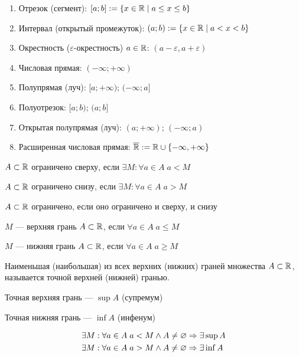 \documentclass{article}
\begin{document}

\begin{enumerate}
	\item Отрезок (сегмент): $[a;b] := \{x\in\mathbb{R}\;|\;a\leq x\leq b\}$
	\item Интервал (открытый промежуток): $(a;b) := \{x\in\mathbb{R}\;|\;a<x<b\}$
	\item Окрестность ($\varepsilon$-окрестность) $a\in\mathbb{R}$: $(a-\varepsilon,a+\varepsilon)$
	\item Числовая прямая: $(-\infty;+\infty)$
	\item Полупрямая (луч): $[a;+\infty)$; $(-\infty;a]$
	\item Полуотрезок: $[a;b)$; $(a;b]$
	\item Открытая полупрямая (луч): $(a;+\infty)$; $(-\infty;a)$
	\item Расширенная числовая прямая: $\overline{\mathbb{R}}:=\mathbb{R}\cup\{-\infty,+\infty\}$
\end{enumerate}


$A\subset\mathbb{R}$ ограничено сверху, если $\exists M:\forall a\in A\;a<M$

$A\subset\mathbb{R}$ ограничено снизу, если $\exists M:\forall a\in A\;a>M$

$A\subset\mathbb{R}$ ограничено, если оно ограничено и сверху, и снизу


$M$ --- верхняя грань $A\subset\mathbb{R}$, если $\forall a\in A\;a\leq M$

$M$ --- нижняя грань $A\subset\mathbb{R}$, если $\forall a\in A\;a\geq M$

Наименьшая (наибольшая) из всех верхних (нижних) граней множества $A\subset\mathbb{R}$,
называется точной верхней (нижней) гранью.

Точная верхняя грань --- $\sup A$ (супремум)

Точная нижняя грань --- $\inf A$ (инфенум)

\theorem
\begin{align*}
	 & \exists M:\forall a\in A\;a<M \land A\neq\varnothing \Rightarrow \exists \sup A \\
	 & \exists M:\forall a\in A\;a>M \land A\neq\varnothing \Rightarrow \exists \inf A \\
\end{align*}
\end{document}
